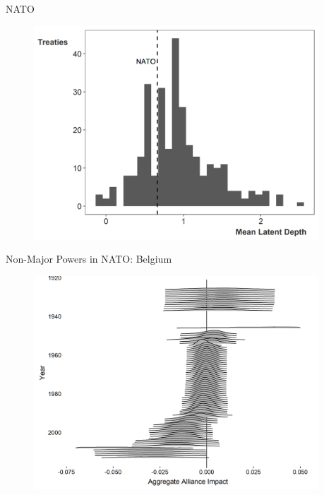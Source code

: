\documentclass[12pt]{beamer}
\begin{document}

\begin{frame}{NATO} 

\begin{figure}
	\centering
		\includegraphics[width=0.95\textwidth]{ld-hist-nato.png}
\end{figure}


 \end{frame}



\begin{frame}{Non-Major Powers in NATO: Belgium}


\begin{figure}
	\centering
		\includegraphics[width=0.95\textwidth]{bel-agg-imp.png}
\end{figure}


\end{frame}
\end{document}
